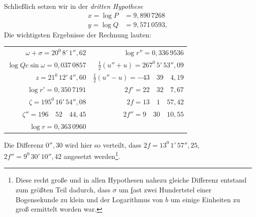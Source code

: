 Schließlich setzen wir in der \textit{dritten Hypothese}
\[
\begin{aligned}
x=\log P&=9{,}890\,7268\\
y=\log Q&=9{,}571\,0593,
\end{aligned}
\]
\noindent Die wichtigsten Ergebnisse der Rechnung lauten:
\begin{center}\begingroup\footnotesize\setlength{\tabcolsep}{6pt}\renewcommand{\arraystretch}{1.3}
\begin{tabular}{r|r}
$\omega+\sigma=20^0\,8'\,1''{,}62$ & $\log r''=0{,}336\,9536$\\
$\log Qc\sin\omega=0{,}037\,0857$ & $\tfrac12(u''+u)=267^0\,5'\,53''{,}09$\\
$z=21^0\,12'\,4''{,}60$ & $\tfrac12(u''-u)=-43\quad39\quad4{,}19$\\
$\log r'=0{,}350\,7191$ & $2f'=22\quad32\quad7{,}67$\\
$\zeta=195^0\,16'\,54''{,}08$ & $2f=13\quad1\quad57{,}42$\\
$\zeta''=196\quad52\quad44{,}45$ & $2f''=9\quad30\quad10{,}55$\\
$\log r=0{,}363\,0960$ &
\end{tabular}\endgroup\end{center}
\noindent{}Die Differenz $0''{,}30$ wird hier so verteilt, dass $2f=13^0\,1'\,57''{,}25$, $2f''=9^0\,30'\,10''{,}42$ angesetzt werden\footnote{Diese recht große und in allen Hypothesen nahezu gleiche Differenz entstand zum größten Teil dadurch, dass $\sigma$ um \underline{f}ast zwei Hundertstel einer Bogensekunde zu klein und der Logarithmus von $b$ um einige Einheiten zu groß ermittelt worden war.}.


